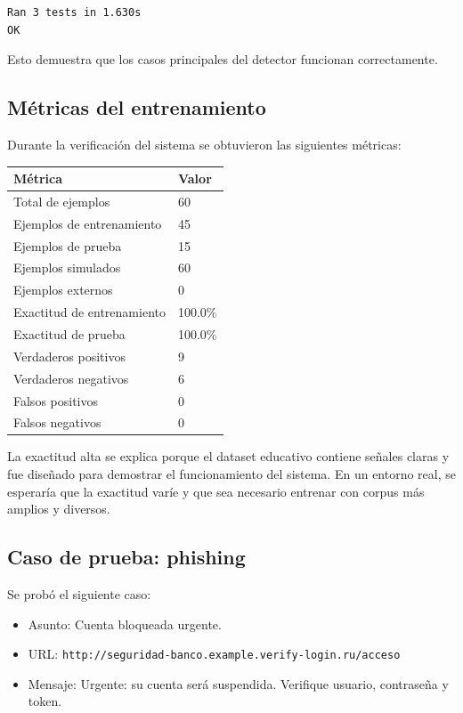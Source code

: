 \documentclass[12pt,letterpaper]{article}
\begin{document}
\begin{verbatim}
Ran 3 tests in 1.630s
OK
\end{verbatim}

Esto demuestra que los casos principales del detector funcionan correctamente.

\subsection{Métricas del entrenamiento}

Durante la verificación del sistema se obtuvieron las siguientes métricas:

\begin{longtable}{p{7cm}p{5cm}}
\toprule
\textbf{Métrica} & \textbf{Valor} \\
\midrule
Total de ejemplos & 60 \\
Ejemplos de entrenamiento & 45 \\
Ejemplos de prueba & 15 \\
Ejemplos simulados & 60 \\
Ejemplos externos & 0 \\
Exactitud de entrenamiento & 100.0\% \\
Exactitud de prueba & 100.0\% \\
Verdaderos positivos & 9 \\
Verdaderos negativos & 6 \\
Falsos positivos & 0 \\
Falsos negativos & 0 \\
\bottomrule
\end{longtable}

La exactitud alta se explica porque el dataset educativo contiene señales claras y fue diseñado para demostrar el funcionamiento del sistema. En un entorno real, se esperaría que la exactitud varíe y que sea necesario entrenar con corpus más amplios y diversos.

\subsection{Caso de prueba: phishing}

Se probó el siguiente caso:

\begin{itemize}
    \item Asunto: Cuenta bloqueada urgente.
    \item URL: \texttt{http://seguridad-banco.example.verify-login.ru/acceso}
    \item Mensaje: Urgente: su cuenta será suspendida. Verifique usuario, contraseña y token.
\end{itemize}
\end{document}
